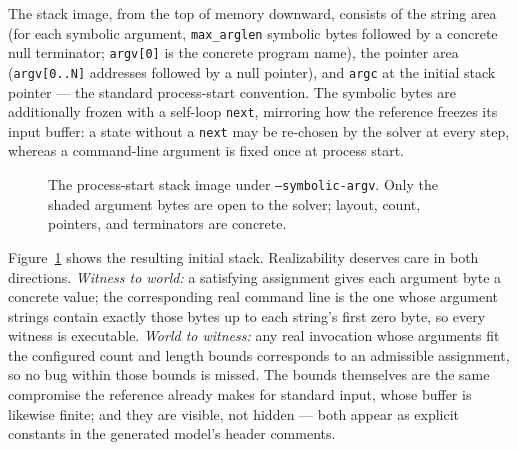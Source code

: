 \documentclass[sigplan,screen,nonacm]{acmart}
\begin{document}
The stack image, from the top of memory downward, consists of the
string area (for each symbolic argument, \texttt{max\_arglen} symbolic
bytes followed by a concrete null terminator; \texttt{argv[0]} is the
concrete program name), the pointer area (\texttt{argv[0..N]} addresses
followed by a null pointer), and \texttt{argc} at the initial stack
pointer --- the standard process-start convention. The symbolic bytes
are additionally frozen with a self-loop \texttt{next}, mirroring how
the reference freezes its input buffer: a state without a \texttt{next}
may be re-chosen by the solver at every step, whereas a command-line
argument is fixed once at process start.

\begin{figure}[t]
\centering
{}
\caption{The process-start stack image under
\texttt{--symbolic-argv}. Only the shaded argument bytes are open to
the solver; layout, count, pointers, and terminators are concrete.}
\label{fig:stack}
\end{figure}

Figure~\ref{fig:stack} shows the resulting initial stack.
Realizability deserves care in both directions. \emph{Witness to
world:} a satisfying assignment gives each argument byte a concrete
value; the corresponding real command line is the one whose argument
strings contain exactly those bytes up to each string's first zero
byte, so every witness is executable. \emph{World to witness:} any real
invocation whose arguments fit the configured count and length bounds
corresponds to an admissible assignment, so no bug within those bounds
is missed. The bounds themselves are the same compromise the reference
already makes for standard input, whose buffer is likewise finite; and
they are visible, not hidden --- both appear as explicit constants in
the generated model's header comments.
\end{document}
